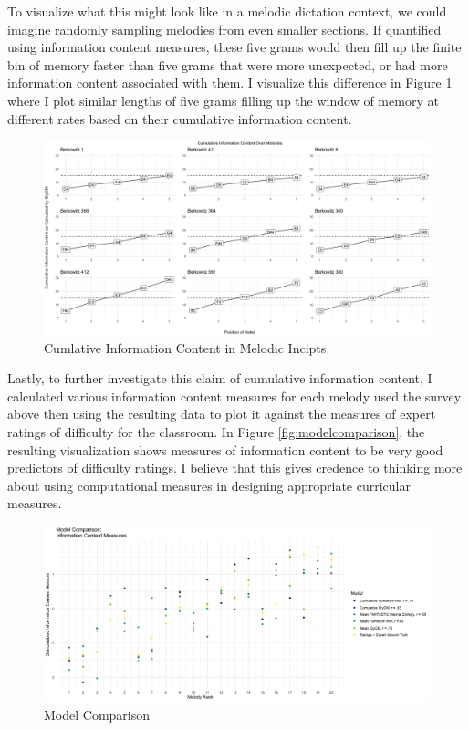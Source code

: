 \documentclass[12pt,]{book}
\begin{document}
To visualize what this might look like in a melodic dictation context, we could imagine randomly sampling melodies from even smaller sections.
If quantified using information content measures, these five grams would then fill up the finite bin of memory faster than five grams that were more unexpected, or had more information content associated with them.
I visualize this difference in Figure \ref{fig:cumplot} where I plot similar lengths of five grams filling up the window of memory at different rates based on their cumulative information content.

\begin{figure}

{\centering \includegraphics[width=1\linewidth]{img/cum_grid_plot} 

}

\caption{Cumlative Information Content in Melodic Incipts}\label{fig:cumplot}
\end{figure}

Lastly, to further investigate this claim of cumulative information content, I calculated various information content measures for each melody used the survey above then using the resulting data to plot it against the measures of expert ratings of difficulty for the classroom.
In Figure \ref{fig:modelcomparison}, the resulting visualization shows measures of information content to be very good predictors of difficulty ratings.
I believe that this gives credence to thinking more about using computational measures in designing appropriate curricular measures.

\begin{figure}

{\centering \includegraphics[width=1\linewidth]{img/model_comparsion_gg} 

}

\caption{Model Comparison}\label{fig:modelcomparsion}
\end{figure}
\end{document}
